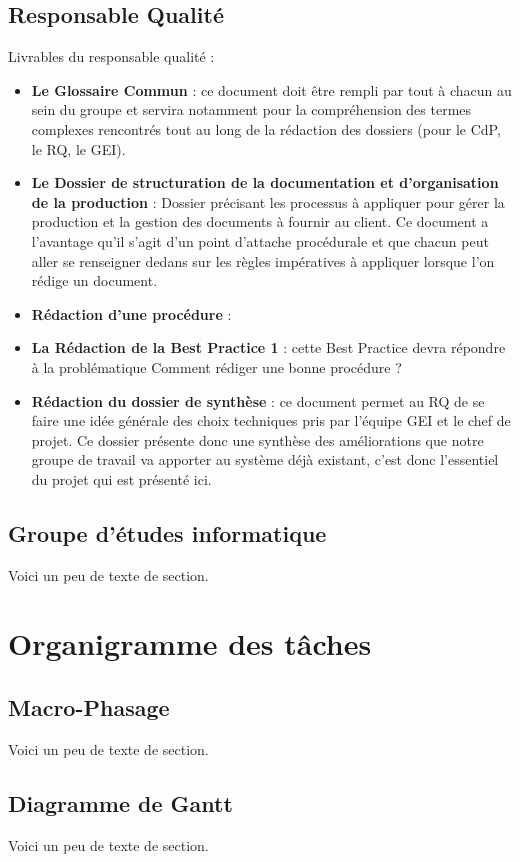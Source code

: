     \subsection{Responsable Qualité}
Livrables du responsable qualité :   
\begin{itemize}
\item \textbf{Le Glossaire Commun} : ce document doit être rempli par tout à chacun au sein du groupe et servira notamment pour la compréhension des termes complexes rencontrés tout au long de la rédaction des dossiers (pour le CdP, le RQ, le GEI).
\item \textbf{Le Dossier de structuration de la documentation et d'organisation de la production} : Dossier précisant les processus à appliquer pour gérer la production et la gestion des documents à fournir au client. Ce document a l'avantage qu'il s'agit d'un point d'attache procédurale et que chacun peut aller se renseigner dedans sur les règles impératives à appliquer lorsque l'on rédige un document.
\item \textbf{Rédaction d'une procédure} : 
\item \textbf{La Rédaction de la Best Practice 1} : cette Best Practice devra répondre à la problématique \og Comment rédiger une bonne procédure ?\fg
\item \textbf{Rédaction du dossier de synthèse} : ce document permet au RQ de se faire une idée générale des choix techniques pris par l'équipe GEI et le chef de projet. Ce dossier présente donc une synthèse des améliorations que notre groupe de travail va apporter au système déjà existant, c'est donc l'essentiel du projet qui est présenté ici.
\end{itemize}

    \subsection{Groupe d'études informatique}
    Voici un peu de texte de section.
    
    \section{Organigramme des tâches}
    \subsection{Macro-Phasage}
    Voici un peu de texte de section.
    \subsection{Diagramme de Gantt}
    Voici un peu de texte de section.
    
